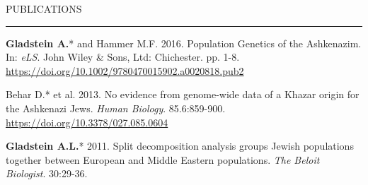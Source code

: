\documentclass{resume} %
\renewenvironment{rSection}[1]{
\sectionskip
\textcolor{RoyalPurple}{\MakeUppercase{#1}}
\sectionlineskip
\hrule
\begin{list}{}{
\setlength{\leftmargin}{1.5em}
}
\item[]
}{
\end{list}
}
\begin{document}
\begin{rSection}{Publications}
\item \textbf{Gladstein A.}* and Hammer M.F. 2016. Population Genetics of the Ashkenazim. In: \textit{eLS}. John Wiley \& Sons, Ltd: Chichester. pp. 1-8. \url{https://doi.org/10.1002/9780470015902.a0020818.pub2}

\item Behar D.* et al. 2013. No evidence from genome-wide data of a Khazar origin for the Ashkenazi Jews. \textit{Human Biology}. 85.6:859-900. \url{https://doi.org/10.3378/027.085.0604}

\item \textbf{Gladstein A.L.}* 2011. Split decomposition analysis groups Jewish populations together between European and Middle Eastern populations. \textit{The Beloit Biologist}. 30:29-36.

\end{rSection}

\end{document}
